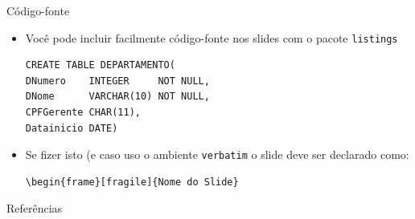 \documentclass{beamer}
\begin{document}
\begin{frame}[fragile]{Código-fonte}
	\begin{itemize}
		\item Você pode incluir facilmente código-fonte nos slides com o pacote \texttt{listings}
		\begin{lstlisting}
CREATE TABLE DEPARTAMENTO(	
DNumero    INTEGER     NOT NULL,
DNome      VARCHAR(10) NOT NULL,
CPFGerente CHAR(11),
Datainicio DATE)
		\end{lstlisting}    

		\item Se fizer isto (e caso uso o ambiente \texttt{verbatim} o slide deve ser declarado como:

    \begin{lstlisting}[style=TeX-Smarzaro]
\begin{frame}[fragile]{Nome do Slide}
    \end{lstlisting}		
	\end{itemize}
\end{frame}

\begin{frame}{Referências}
    \nocite{Silberschatz2014,Elmasri2011,Coronel2010,Date2004,Teorey2013,Puga2013}
    \printbibliography
\end{frame}
\end{document}
